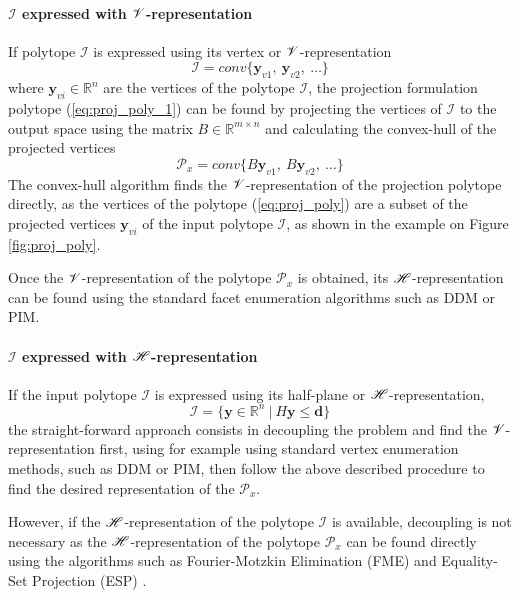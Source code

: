 \paragraph*{$\mathcal{I}$ expressed with $\mathscr{V}$-representation } If polytope $\mathcal{I}$ is expressed using its vertex or $\mathscr{V}$-representation
\begin{equation}
    \mathcal{I} = conv\{ \bm{y}_{v1}, ~ \bm{y}_{v2},~ \ldots\}
\end{equation}
where $\bm{y}_{vi}\in\mathbb{R}^n$ are the vertices of the polytope $\mathcal{I}$, the projection formulation polytope (\ref{eq:proj_poly_1}) can be found by projecting the vertices of $\mathcal{I}$ to the output space using the matrix $B \in \mathbb{R}^{m\times n}$ and calculating the convex-hull of the projected vertices
\begin{equation}
    \mathcal{P}_x= conv\{ B\bm{y}_{v1}, ~ B\bm{y}_{v2},~ \ldots\}
\end{equation}
The convex-hull algorithm finds the $\mathscr{V}$-representation of the projection polytope directly, as the vertices of the polytope (\ref{eq:proj_poly}) are a subset of the projected vertices $\bm{y}_{vi}$ of the input polytope $\mathcal{I}$, as shown in the example on Figure \ref{fig:proj_poly}. 

Once the $\mathscr{V}$-representation of the polytope $\mathcal{P}_x$ is obtained, its $\mathscr{H}$-representation can be found using the standard facet enumeration algorithms such as DDM \cite{fukuda_dd} or PIM\cite{avis_pivoting_nodate}.

\paragraph*{$\mathcal{I}$ expressed with $\mathscr{H}$-representation } If the input polytope $\mathcal{I}$ is expressed using its half-plane or $\mathscr{H}$-representation, 
\begin{equation}
    \mathcal{I} = \{ \bm{y}\in\mathbb{R}^n ~|~H\bm{y} \leq \bm{d}\}
\end{equation}
the straight-forward approach consists in decoupling the problem and find the $\mathscr{V}$-representation first, using for example using standard vertex enumeration methods, such as DDM\cite{fukuda_dd} or PIM\cite{avis_pivoting_nodate}, then follow the above described procedure to find the desired representation of the $\mathcal{P}_x$. 

However, if the $\mathscr{H}$-representation of the polytope $\mathcal{I}$ is available, decoupling is not necessary as the $\mathscr{H}$-representation of the polytope $\mathcal{P}_x$ can be found directly using the algorithms such as Fourier-Motzkin Elimination (FME) \cite{dantzig1973fourier} and Equality-Set Projection (ESP) \cite{jones2004equality}. 

